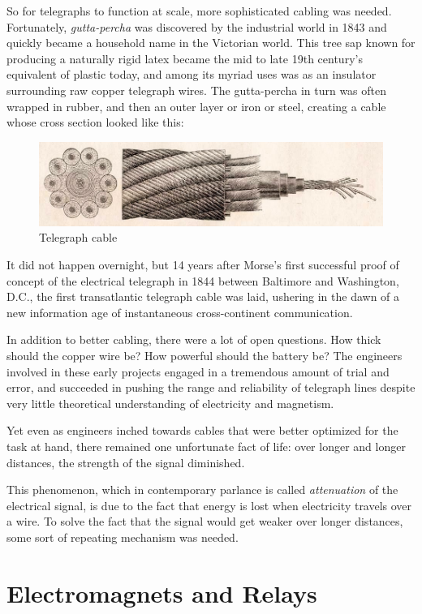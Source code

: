 \documentclass[UTF8]{book}
\begin{document}
\begin{CJK}{UTF8}{gbsn}
So for telegraphs to function at scale, more sophisticated cabling was needed. Fortunately, \emph{gutta-percha} was discovered by the industrial world in 1843 and quickly became a household name in the Victorian world. This tree sap known for producing a naturally rigid latex became the mid to late 19th century's equivalent of plastic today, and among its myriad uses was as an insulator surrounding raw copper telegraph wires. The gutta-percha in turn was often wrapped in rubber, and then an outer layer or iron or steel, creating a cable whose cross section looked like this:

\begin{figure}[H]
\centering
\includegraphics[width=0.8\linewidth]{cable-cross-section}
\caption{Telegraph cable}
\end{figure}

It did not happen overnight, but 14 years after Morse's first successful proof of concept of the electrical telegraph in 1844 between Baltimore and Washington, D.C., the first transatlantic telegraph cable was laid, ushering in the dawn of a new information age of instantaneous cross-continent communication.

In addition to better cabling, there were a lot of open questions. How thick should the copper wire be? How powerful should the battery be? The engineers involved in these early projects engaged in a tremendous amount of trial and error, and succeeded in pushing the range and reliability of telegraph lines despite very little theoretical understanding of electricity and magnetism.

Yet even as engineers inched towards cables that were better optimized for the task at hand, there remained one unfortunate fact of life: over longer and longer distances, the strength of the signal diminished.

This phenomenon, which in contemporary parlance is called \emph{attenuation} of the electrical signal, is due to the fact that energy is lost when electricity travels over a wire. To solve the fact that the signal would get weaker over longer distances, some sort of repeating mechanism was needed.

\section{Electromagnets and Relays}


\end{CJK}
\end{document}
